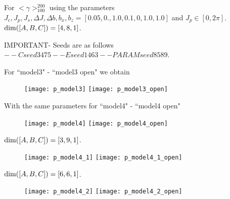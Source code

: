 \documentclass[floatfix]{article}
\newcommand*{\ud}{
\underline{\space\space}}
\begin{document}
For $<\gamma>_{100}^{200}$ using the parameters $J_c,J_p,J_s,\Delta J,\Delta b,b_x,b_z=[0.05,0.,1.0,0.1,0,1.0,1.0] $ 
and $J_p \in [0,2\pi]$. ${\rm dim}([A,B,C])=[4,8,1]$.

IMPORTANT- Seeds are as follows $--Cseed 3475 --Eseed 1463 --PARAMseed 8589$.

For ``model3" - ``model3\ud open" we obtain

\begin{figure}[H]
\begin{center}
\texttt{[image: p\_model3]}  
\texttt{[image: p\_model3\_open]}  
\end{center}
\caption{}
\label{p_m3}
\end{figure}




With the same parameters for ``model4" - ``model4\ud open"

\begin{figure}[H]
\begin{center}
\texttt{[image: p\_model4]}  
\texttt{[image: p\_model4\_open]}  
\end{center}
\caption{}
\label{p_m4}
\end{figure}


% 
% 
% 

${\rm dim}([A,B,C])=[3,9,1]$.

\begin{figure}[H]
\begin{center}
\texttt{[image: p\_model4\_1]}  
\texttt{[image: p\_model4\_1\_open]}  
\end{center}
\caption{}
\label{p_m4}
\end{figure}

${\rm dim}([A,B,C])=[6,6,1]$.

\begin{figure}[H]
\begin{center}
\texttt{[image: p\_model4\_2]}  
\texttt{[image: p\_model4\_2\_open]}  
\end{center}
\caption{}
\label{p_m4}
\end{figure}
\end{document}
